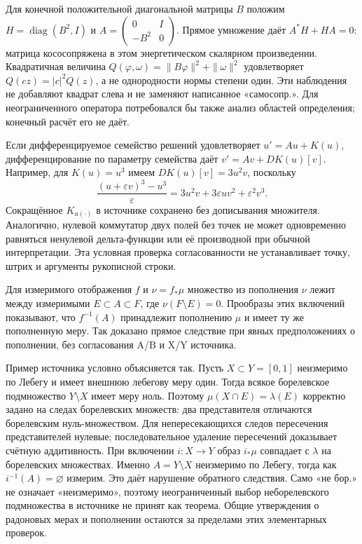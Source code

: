 \documentclass[11pt]{article}
\begin{document}
Для конечной положительной диагональной матрицы $B$ положим $H=\operatorname{diag}(B^2,I)$ и $A=\left(\begin{smallmatrix}0&I\\-B^2&0\end{smallmatrix}\right)$. Прямое умножение даёт $A^*H+HA=0$: матрица кососопряжена в этом энергетическом скалярном произведении. Квадратичная величина $Q(\varphi,\omega)=\|B\varphi\|^2+\|\omega\|^2$ удовлетворяет $Q(cz)=|c|^2Q(z)$, а не однородности нормы степени один. Эти наблюдения не добавляют квадрат слева и не заменяют написанное «самосопр.». Для неограниченного оператора потребовался бы также анализ областей определения; конечный расчёт его не даёт.

Если дифференцируемое семейство решений удовлетворяет $u'=Au+K(u)$, дифференцирование по параметру семейства даёт $v'=Av+DK(u)[v]$. Например, для $K(u)=u^3$ имеем $DK(u)[v]=3u^2v$, поскольку
\[
\frac{(u+\varepsilon v)^3-u^3}{\varepsilon}
=3u^2v+3\varepsilon uv^2+\varepsilon^2v^3.
\]
Сокращённое $K_{u(\cdot)}$ в источнике сохранено без дописывания множителя. Аналогично, нулевой коммутатор двух полей без точек не может одновременно равняться ненулевой дельта-функции или её производной при обычной интерпретации. Эта условная проверка согласованности не устанавливает точку, штрих и аргументы рукописной строки.

Для измеримого отображения $f$ и $\nu=f_*\mu$ множество из пополнения $\nu$ лежит между измеримыми $E\subset A\subset F$, где $\nu(F\setminus E)=0$. Прообразы этих включений показывают, что $f^{-1}(A)$ принадлежит пополнению $\mu$ и имеет ту же пополненную меру. Так доказано прямое следствие при явных предположениях о пополнении, без согласования A/B и X/Y источника.

Пример источника условно объясняется так. Пусть $X\subset Y=[0,1]$ неизмеримо по Лебегу и имеет внешнюю лебегову меру один. Тогда всякое борелевское подмножество $Y\setminus X$ имеет меру ноль. Поэтому $\mu(X\cap E)=\lambda(E)$ корректно задано на следах борелевских множеств: два представителя отличаются борелевским нуль-множеством. Для непересекающихся следов пересечения представителей нулевые; последовательное удаление пересечений доказывает счётную аддитивность. При включении $i:X\to Y$ образ $i_*\mu$ совпадает с $\lambda$ на борелевских множествах. Именно $A=Y\setminus X$ неизмеримо по Лебегу, тогда как $i^{-1}(A)=\varnothing$ измерим. Это даёт нарушение обратного следствия. Само «не бор.» не означает «неизмеримо», поэтому неограниченный выбор неборелевского подмножества в источнике не принят как теорема. Общие утверждения о радоновых мерах и пополнении остаются за пределами этих элементарных проверок.
\end{document}
